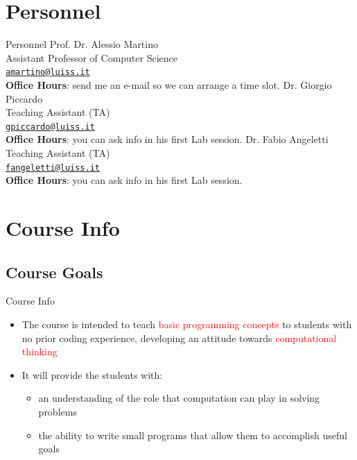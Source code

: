 \documentclass[t,handout,9pt]{beamer}
\begin{document}
\section{Personnel}
\begin{frame}{Personnel}
\vfill
Prof. Dr. Alessio Martino\\
\qquad Assistant Professor of Computer Science\\
\qquad \href{mailto:amartino@luiss.it}{\texttt{amartino@luiss.it}}\\
\qquad \textbf{Office Hours}: send me an e-mail so we can arrange a time slot.
\vfill
Dr. Giorgio Piccardo\\
\qquad Teaching Assistant (TA)\\
\qquad \href{mailto:gpiccardo@luiss.it}{\texttt{gpiccardo@luiss.it}}\\
\qquad \textbf{Office Hours}: you can ask info in his first Lab session.
\vfill
Dr. Fabio Angeletti\\
\qquad Teaching Assistant (TA)\\
\qquad \href{mailto:fangeletti@luiss.it}{\texttt{fangeletti@luiss.it}}\\
\qquad \textbf{Office Hours}: you can ask info in his first Lab session.
\vfill
\end{frame}
\section{Course Info}
\subsection{Course Goals}
\begin{frame}{Course Info}
\vfill
\begin{itemize}
	\item The course is intended to teach \textcolor{red}{basic programming concepts} to students with no prior coding experience, developing an attitude towards \textcolor{red}{computational thinking}
	\vfill
	\item It will provide the students with:
	\begin{itemize}
		\item an understanding of the role that computation can play in solving problems
		\item the ability to write small programs that allow them to accomplish useful goals
	\end{itemize}
\end{itemize}
\vfill
\end{frame}
%
\end{document}
